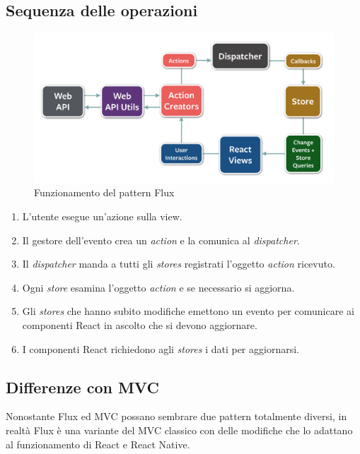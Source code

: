 \subsection{Sequenza delle operazioni}

\begin{figure}[htp]
\centering
\includegraphics[width=\textwidth*3/4]{../immagini/flux-diagram}
\caption{Funzionamento del pattern Flux}  
\end{figure}
\FloatBarrier

\begin{enumerate}
\item L'utente esegue un'azione sulla view.
\item Il gestore dell'evento crea un \textit{action} e la comunica al \textit{dispatcher}.
\item Il \textit{dispatcher} manda a tutti gli \textit{stores} registrati l'oggetto \textit{action} ricevuto.
\item Ogni \textit{store} esamina l'oggetto  \textit{action} e se necessario si aggiorna. 
\item Gli \textit{stores} che hanno subito modifiche emettono un evento per comunicare ai componenti React in ascolto che si devono aggiornare.
\item I componenti React richiedono agli \textit{stores} i dati per aggiornarsi.
\end{enumerate}

\subsection{Differenze con MVC}

Nonostante Flux ed MVC possano sembrare due pattern totalmente diversi, in realtà Flux è una variante del MVC classico con delle modifiche che lo adattano al funzionamento di React e React Native.

